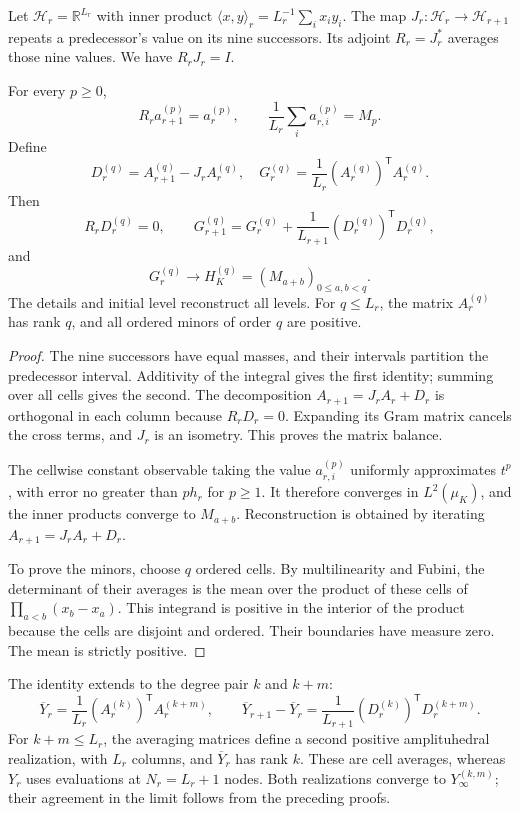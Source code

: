Let \(\mathcal H_r=\mathbb R^{L_r}\) with inner product
\(\langle x,y\rangle_r=L_r^{-1}\sum_i x_i y_i\). The map
\(J_r:\mathcal H_r\to\mathcal H_{r+1}\) repeats a predecessor's value
on its nine successors. Its adjoint \(R_r=J_r^*\) averages those
nine values. We have \(R_rJ_r=I\).

\begin{theorem}
\label{thm:dim-cell-balance}
For every \(p\geq0\),
\[
 R_r a_{r+1}^{(p)}=a_r^{(p)},\qquad
 \frac1{L_r}\sum_i a_{r,i}^{(p)}=M_p.
\]
Define
\[
 D_r^{(q)}=A_{r+1}^{(q)}-J_rA_r^{(q)},\quad
 G_r^{(q)}=\frac1{L_r}(A_r^{(q)})^{\mathsf T}A_r^{(q)}.
\]
Then
\[
 R_rD_r^{(q)}=0,\qquad
 G_{r+1}^{(q)}=G_r^{(q)}+
       \frac1{L_{r+1}}(D_r^{(q)})^{\mathsf T}D_r^{(q)},
\]
and
\[
 G_r^{(q)}\longrightarrow H_K^{(q)}=(M_{a+b})_{0\leq a,b<q}.
\]
The details and initial level reconstruct all levels. For
\(q\leq L_r\), the matrix \(A_r^{(q)}\) has rank \(q\), and
all ordered minors of order \(q\) are positive.
\end{theorem}
\begin{proof}
The nine successors have equal masses, and their intervals partition the
predecessor interval. Additivity of the integral gives the first identity;
summing over all cells gives the second. The decomposition
\(A_{r+1}=J_rA_r+D_r\) is orthogonal in each column because
\(R_rD_r=0\). Expanding its Gram matrix cancels the cross terms,
and \(J_r\) is an isometry. This proves the matrix balance.

The cellwise constant observable taking the value \(a_{r,i}^{(p)}\)
uniformly approximates \(t^p\), with error no greater than \(p h_r\)
for \(p\geq1\). It therefore converges in \(L^2(\mu_K)\), and
the inner products converge to \(M_{a+b}\). Reconstruction is
obtained by iterating \(A_{r+1}=J_rA_r+D_r\).

To prove the minors, choose \(q\) ordered cells. By multilinearity
and Fubini, the determinant of their averages is the mean over the
product of these cells of \(\prod_{a<b}(x_b-x_a)\). This integrand
is positive in the interior of the product because the cells are
disjoint and ordered. Their boundaries have measure zero. The mean
is strictly positive.
\end{proof}

The identity extends to the degree pair \(k\) and \(k+m\):
\[
 \overline Y_r=\frac1{L_r}(A_r^{(k)})^{\mathsf T}A_r^{(k+m)},
 \qquad
 \overline Y_{r+1}-\overline Y_r
 =\frac1{L_{r+1}}(D_r^{(k)})^{\mathsf T}D_r^{(k+m)}.
\]
For \(k+m\leq L_r\), the averaging matrices define a second
positive amplituhedral realization, with \(L_r\) columns, and
\(\overline Y_r\) has rank \(k\). These are cell averages,
whereas \(Y_r\) uses evaluations at \(N_r=L_r+1\) nodes. Both
realizations converge to \(Y_\infty^{(k,m)}\); their agreement
in the limit follows from the preceding proofs.

